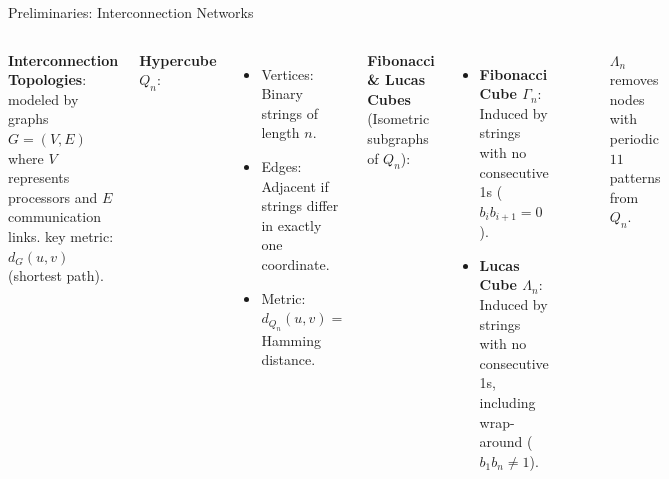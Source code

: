 \documentclass[10pt, aspectratio=169]{beamer}
\begin{document}
\begin{frame}{Preliminaries: Interconnection Networks}
    \begin{columns}
        \textbf{Interconnection Topologies}:
        modeled by graphs $G=(V,E)$ where $V$ represents processors and $E$ communication links. key metric: $d_G(u,v)$ (shortest path).
        
        \vspace{0.2cm}
        \textbf{Hypercube $Q_n$}:
        \begin{itemize} \footnotesize
            \item Vertices: Binary strings of length $n$.
            \item Edges: Adjacent if strings differ in exactly one coordinate.
            \item Metric: $d_{Q_n}(u,v) = $ Hamming distance.
        \end{itemize}

        \vspace{0.2cm}
        \textbf{Fibonacci \& Lucas Cubes} (Isometric subgraphs of $Q_n$):
        \begin{itemize} \footnotesize
            \item \textbf{Fibonacci Cube $\Gamma_n$}: Induced by strings with no consecutive 1s ($b_i b_{i+1} = 0$).
            \item \textbf{Lucas Cube $\Lambda_n$}: Induced by strings with no consecutive 1s, including wrap-around ($b_1 b_n \neq 1$).
        \end{itemize}

        \begin{figure}
            \centering
            \caption{\footnotesize $\Lambda_n$ removes nodes with periodic $11$ patterns from $Q_n$.}
        \end{figure}
    \end{columns}
\end{frame}
\end{document}
